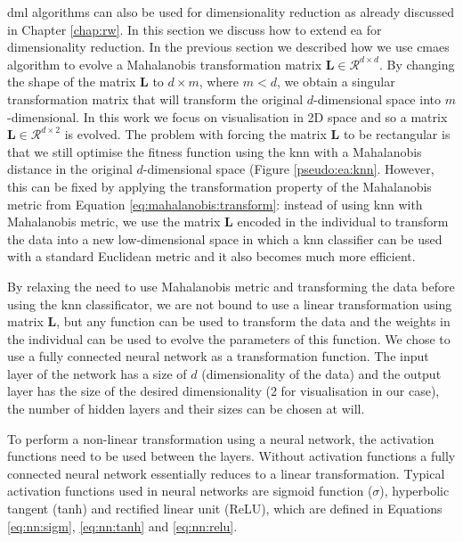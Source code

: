 \documentclass[12pt,a4paper]{report}
\begin{document}
\acl{dml} algorithms can also be used for dimensionality reduction as already discussed in Chapter \ref{chap:rw}. In this section we discuss how to extend \acl{ea} for dimensionality reduction. In the previous section we described how we use \ac{cmaes} algorithm to evolve a Mahalanobis transformation matrix $\bm{L} \in \mathcal{R}^{d\times d}$. By changing the shape of the matrix $\bm{L}$ to $d\times m$, where $m < d$, we obtain a singular transformation matrix that will transform the original $d$-dimensional space into $m$-dimensional. In this work we focus on visualisation in 2D space and so a matrix $\bm{L} \in \mathcal{R}^{d\times 2}$ is evolved. The problem with forcing the matrix $\bm{L}$ to be rectangular is that we still optimise the fitness function using the \ac{knn} with a Mahalanobis distance in the original $d$-dimensional space (Figure \ref{pseudo:ea:knn}. However, this can be fixed by applying the transformation property of the Mahalanobis metric from Equation \ref{eq:mahalanobis:transform}: instead of using \ac{knn} with Mahalanobis metric, we use the matrix $\bm{L}$ encoded in the individual to transform the data into a new low-dimensional space in which a \ac{knn} classifier can be used with a standard Euclidean metric and it also becomes much more efficient.

By relaxing the need to use Mahalanobis metric and transforming the data before using the \ac{knn} classificator, we are not bound to use a linear transformation using matrix $\bm{L}$, but any function can be used to transform the data and the weights in the individual can be used to evolve the parameters of this function. We chose to use a fully connected neural network as a transformation function. The input layer of the network has a size of $d$ (dimensionality of the data) and the output layer has the size of the desired dimensionality (2 for visualisation in our case), the number of hidden layers and their sizes can be chosen at will. 

To perform a non-linear transformation using a neural network, the activation functions need to be used between the layers. Without activation functions a fully connected neural network essentially reduces to a linear transformation. Typical activation functions used in neural networks are sigmoid function ($\sigma$), hyperbolic tangent (tanh) and rectified linear unit (ReLU), which are defined in Equations \ref{eq:nn:sigm}, \ref{eq:nn:tanh} and \ref{eq:nn:relu}.
\end{document}
